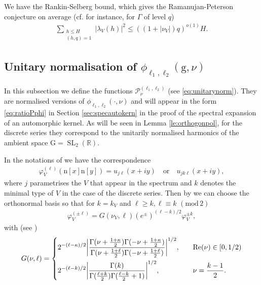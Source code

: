\documentclass[12pt]{amsart}
\theoremstyle{definition}
\theoremstyle{remark}
\numberwithin{equation}{section}
\newcommand{\G}{\mathrm{G}}
\newcommand{\R}{{\mathbb R}}
\newcommand{\1}{{\mathbf 1}}
\newcommand{\SL}{\operatorname{SL}}
\renewcommand{\Re}{\operatorname{Re}}
\newcommand{\n}{\mathrm{n}}
\newcommand{\g}{\mathrm{g}}
\renewcommand{\n}{\mathrm{n}}
\renewcommand{\pmod}[1]{\,\,(\mathrm{mod}\,{#1})}
\begin{document}
We have the Rankin-Selberg bound, which gives the Ramanujan-Peterson conjecture on average (cf.  for instance, \cite[Theorem 8.3]{IwaniecBook} for $\Gamma$ of level $q$)
    \begin{align} \label{eq:rankinselberg}
        \sum_{\substack{h \leq H \\ (h,q)=1}} |\lambda_V(h)|^2 \leq ((1+|\nu_V|)q)^{o(1)} H.
    \end{align}

\subsection{Unitary normalisation of $\phi_{\ell_1,\ell_2}(\g,\nu)$} 
In this subsection we define the functions $\mathcal{P}^{(\ell_1,\ell_2)}_{\nu}$ (see  \eqref{eq:unitarynorm}). They are normalised versions of $\phi_{\ell_1,\ell_2}(\cdot,\nu)$ and will appear in the form \eqref{eq:ratioPphi} in Section \ref{sec:specautokern} in the proof of the spectral expansion of an automorphic kernel. As will be seen in Lemma \ref{le:orthogonpol}, for the discrete series they correspond to the unitarily normalised harmonics of the ambient space $\G=\SL_2(\R)$.

In the notations of \cite[(4.57), (4.58)]{DFIartin} we have the correspondence 
\begin{align}\label{eq:DFIcorrespondence}
    \varphi_V^{(\ell)}(\n[x] \n[y] ) = u_{j \ell}(x+iy) \quad \text{or} \quad u_{j k \ell}(x+iy),
\end{align}
where $j$ parametrises the $V$ that appear in the spectrum and $k$ denotes the minimal type of $V$ in the case of the discrete series. Then by \cite[Corollary 4.4]{DFIartin} we can choose the orthonormal basis so that for $k=k_V$ and $\ell \geq k, \ell \equiv k \pmod{2}$
\begin{align} \label{eq:raisingvarphi}
     \varphi_V^{(\pm \ell)} = G(\nu_V,\ell) (e^{\pm})^{(\ell-k)/2}\varphi_V^{\pm k},
\end{align}
with (see  \cite[eq. (4.59), (4.60)]{DFIartin})
\begin{align*}
    G(\nu,\ell) = \begin{dcases}
        2^{-(\ell-\kappa)/2} \bigg| \frac{\Gamma(\nu +\frac{1+\kappa}{2}) \Gamma(-\nu + \frac{1+\kappa}{2})}{\Gamma(\nu+\frac{1+\ell}{2}) \Gamma(-\nu+\frac{1+\ell}{2})} \bigg|^{1/2}, \quad &\Re(\nu) \in [0,1/2) \\
        2^{-(\ell-k)/2}\bigg|\frac{\Gamma(k)}{\Gamma(\frac{\ell+k}{2})\Gamma(\frac{\ell-k}{2}+1)} \bigg|^{1/2}, \quad &\nu= \frac{k-1}{2}.
    \end{dcases}
\end{align*}
\end{document}
